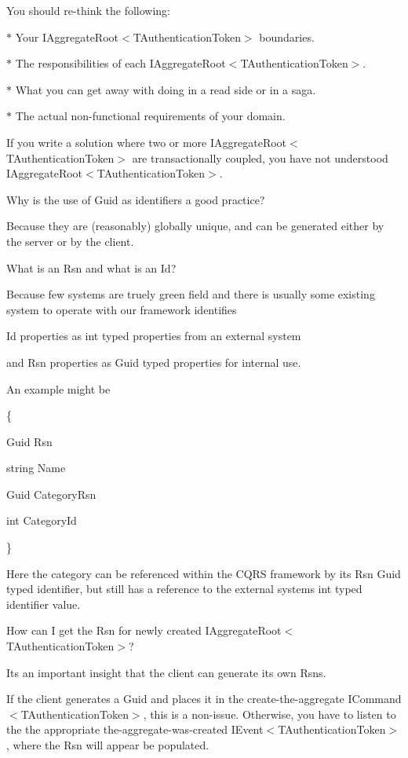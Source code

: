You should re-\/think the following\+: 

$\ast$ Your I\+Aggregate\+Root$<$\+T\+Authentication\+Token$>$ boundaries. 

$\ast$ The responsibilities of each I\+Aggregate\+Root$<$\+T\+Authentication\+Token$>$. 

$\ast$ What you can get away with doing in a read side or in a saga. 

$\ast$ The actual non-\/functional requirements of your domain. 

If you write a solution where two or more I\+Aggregate\+Root$<$\+T\+Authentication\+Token$>$ are transactionally coupled, you have not understood I\+Aggregate\+Root$<$\+T\+Authentication\+Token$>$. 

Why is the use of Guid as identifiers a good practice? 

Because they are (reasonably) globally unique, and can be generated either by the server or by the client. 

What is an Rsn and what is an Id? 

Because few systems are truely green field and there is usually some existing system to operate with our framework identifies 

Id properties as int typed properties from an external system 

and Rsn properties as Guid typed properties for internal use. 

An example might be 

\{ 

Guid Rsn 

string Name 

Guid Category\+Rsn 

int Category\+Id 

\} 

Here the category can be referenced within the C\+Q\+RS framework by it\textquotesingle{}s Rsn Guid typed identifier, but still has a reference to the external systems int typed identifier value. 

How can I get the Rsn for newly created I\+Aggregate\+Root$<$\+T\+Authentication\+Token$>$? 

It\textquotesingle{}s an important insight that the client can generate its own Rsns. 

If the client generates a Guid and places it in the create-\/the-\/aggregate I\+Command$<$\+T\+Authentication\+Token$>$, this is a non-\/issue. Otherwise, you have to listen to the the appropriate the-\/aggregate-\/was-\/created I\+Event$<$\+T\+Authentication\+Token$>$, where the Rsn will appear be populated. 

